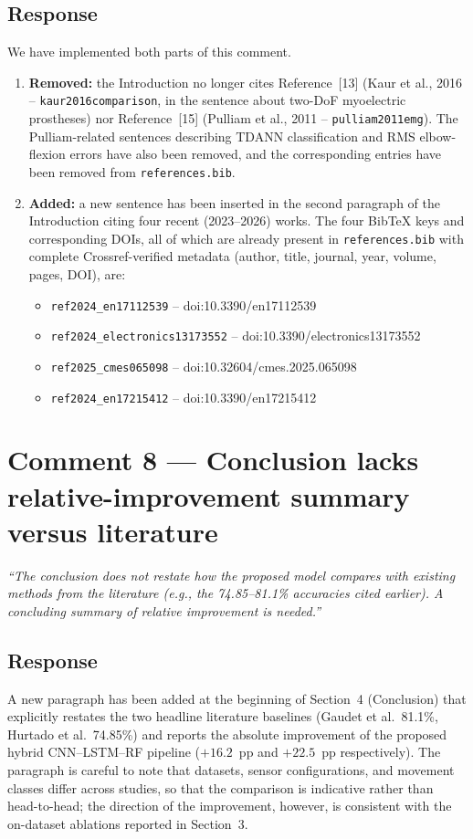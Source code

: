\documentclass[11pt,a4paper]{article}
\begin{document}
\subsection*{Response}
We have implemented both parts of this comment.
\begin{enumerate}
  \item \textbf{Removed:} the Introduction no longer cites Reference~[13] (Kaur et al., 2016 -- \texttt{kaur2016comparison}, in the sentence about two-DoF myoelectric prostheses) nor Reference~[15] (Pulliam et al., 2011 -- \texttt{pulliam2011emg}). The Pulliam-related sentences describing TDANN classification and RMS elbow-flexion errors have also been removed, and the corresponding entries have been removed from \texttt{references.bib}.
  \item \textbf{Added:} a new sentence has been inserted in the second paragraph of the Introduction citing four recent (2023--2026) works. The four BibTeX keys and corresponding DOIs, all of which are already present in \texttt{references.bib} with complete Crossref-verified metadata (author, title, journal, year, volume, pages, DOI), are:
  \begin{itemize}
    \item \texttt{ref2024\_en17112539} -- doi:10.3390/en17112539
    \item \texttt{ref2024\_electronics13173552} -- doi:10.3390/electronics13173552
    \item \texttt{ref2025\_cmes065098} -- doi:10.32604/cmes.2025.065098
    \item \texttt{ref2024\_en17215412} -- doi:10.3390/en17215412
  \end{itemize}
\end{enumerate}

\section*{Comment 8 — Conclusion lacks relative-improvement summary versus literature}
\textit{``The conclusion does not restate how the proposed model compares with existing methods from the literature (e.g., the 74.85--81.1\% accuracies cited earlier). A concluding summary of relative improvement is needed.''}

\subsection*{Response}
A new paragraph has been added at the beginning of Section~4 (Conclusion) that explicitly restates the two headline literature baselines (Gaudet et al.\ 81.1\%, Hurtado et al.\ 74.85\%) and reports the absolute improvement of the proposed hybrid CNN--LSTM--RF pipeline ($+16.2$~pp and $+22.5$~pp respectively). The paragraph is careful to note that datasets, sensor configurations, and movement classes differ across studies, so that the comparison is indicative rather than head-to-head; the direction of the improvement, however, is consistent with the on-dataset ablations reported in Section~3.
\end{document}
